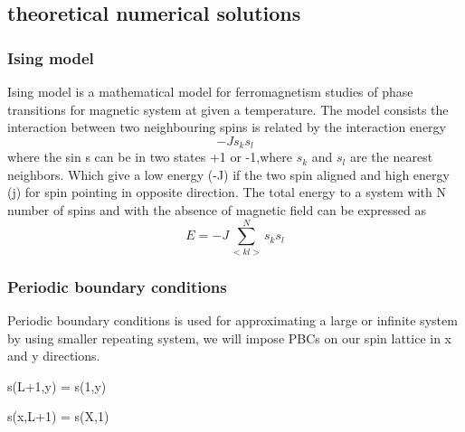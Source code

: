 \documentclass[10pt,a4paper]{article}
\begin{document}
\subsection{theoretical numerical solutions}

\subsubsection{Ising model}
Ising model is a mathematical model for ferromagnetism studies of phase transitions for magnetic system at given a temperature. The model consists the interaction between two neighbouring spins is related by the interaction energy 
\begin{equation}
  -Js_ks_l
\end{equation} 
where the sin s can be in two states +1 or -1,where  $s_k$ and $s_l$ are the nearest neighbors. Which give a low energy (-J) if the two spin aligned and high energy (j) for spin pointing in opposite direction. The total energy to a system with N number of spins and with the absence of magnetic field can be expressed as 
\begin{equation}
  E=-J\sum_{<kl>}^{N}s_ks_l
\end{equation}

  
  \subsubsection{Periodic boundary conditions} 
Periodic boundary conditions is used for approximating a large or infinite system by using smaller repeating system, we will impose PBCs on our spin lattice in x and y directions.

 s(L+1,y) = s(1,y)
 
 s(x,L+1) = s(X,1)  
\end{document}
